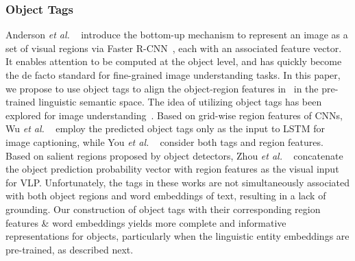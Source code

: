 \documentclass[runningheads]{llncs}
\newcommand{\ea}[0]{\emph{et al. }}
\def\secvspace{{\vspace{-4mm}}}
\begin{document}
\subsubsection{Object Tags} Anderson \ea ~\cite{anderson2018bottom} introduce the bottom-up mechanism to represent an image as a set of visual regions via Faster R-CNN~\cite{ren2015faster}, each with an associated feature vector. It enables attention to be computed at the object level, and has quickly become the de facto standard for fine-grained image understanding tasks. In this paper, we propose to use object tags to align the object-region features in~\cite{anderson2018bottom} in the pre-trained linguistic semantic space. The idea of utilizing object tags has been explored for image understanding~\cite{wu2016value,you2016image,zhou2019unified}. Based on grid-wise region features of CNNs, Wu \ea~\cite{wu2016value} employ the predicted object tags only as the input to LSTM for image captioning, while You \ea~\cite{you2016image} consider both tags and region features. Based on salient regions proposed by object detectors, Zhou \ea~\cite{zhou2019unified} concatenate the object prediction probability vector with region features as the visual input for VLP. Unfortunately, the tags in these works are not simultaneously associated with both object regions and word embeddings of text, resulting in a lack of grounding. Our construction of object tags with their corresponding region features \& word embeddings yields more complete and informative representations for objects, particularly when the linguistic entity embeddings are pre-trained, as described next. 

\secvspace
\end{document}

